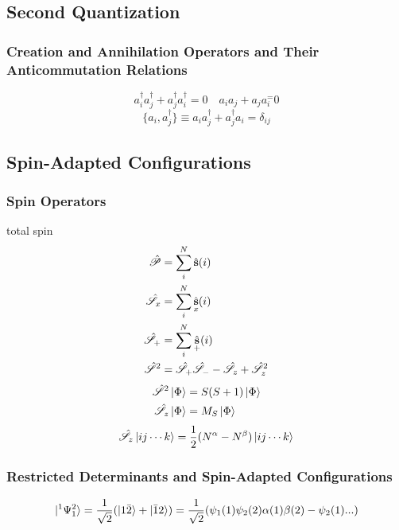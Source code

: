 \documentclass[a4paper]{article}
\DeclareMathOperator{\hs}{\hat{\vb{s}}}
\newcommand{\hsS}{\hat{\mathscr{S}}}
\numberwithin{equation}{section}
\begin{document}
\subsection{Second Quantization}
\subsubsection{Creation and Annihilation Operators and Their Anticommutation Relations}
\begin{equation}\label{key}
a_i^\dagger a_j^\dagger + a_j^\dagger a_i^\dagger = 0 \quad a_i a_j + a_j a_i^ = 0
\end{equation}
\begin{equation}\label{key}
\{a_i, a_j^\dagger\} \equiv a_i a_j^\dagger + a_j^\dagger a_i = \delta_{ij}
\end{equation}

\subsection{Spin-Adapted Configurations}
\subsubsection{Spin Operators}
total spin
\begin{align}
\hat{\mathscr{P}} &= \sum_i^N \hs(i)\\
\hsS_x &= \sum_i^N \hs_x(i)\\
\hsS_+ &= \sum_i^N \hs_+(i)\\
\hsS^2 &= \hsS_+\hsS_- - \hsS_z + \hsS_z^2
\end{align}
\begin{align}
\hsS^2\ket{\Phi} &= S(S+1)\ket{\Phi}\\
\hsS_z\ket{\Phi} &= M_S\ket{\Phi}
\end{align}
\begin{equation}\label{key}
\hsS_z\ket{ij\cdots k} = \dfrac{1}{2}(N^\alpha - N^\beta)\ket{ij\cdots k}
\end{equation}

\subsubsection{Restricted Determinants and Spin-Adapted Configurations}
\begin{equation}\label{key}
\ket{^1\Psi_1^2} = \dfrac{1}{\sqrt{2}}(\ket{1\bar{2}} + \ket{\bar{1}2})
= \dfrac{1}{\sqrt{2}}(\psi_1(1)\psi_2(2)\alpha(1)\beta(2) - \psi_2(1)...)
\end{equation}
\end{document}
